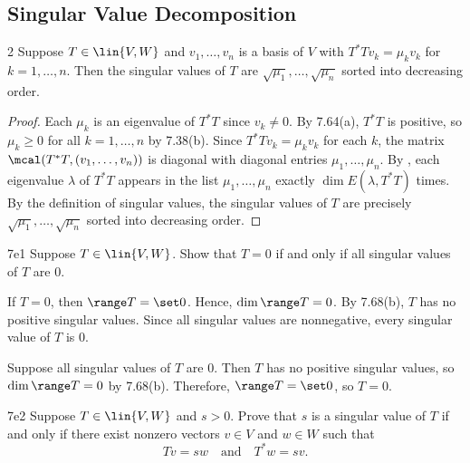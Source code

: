 \subsection{Singular Value Decomposition}

\begin{lemma}{2}
    Suppose $T \in \lin{V, W}$ and $v_1, \ldots, v_n$ is a basis of $V$ with $T^\ast T v_k = \mu_k v_k$ for $k = 1, \ldots, n$.
    Then the singular values of $T$ are $\sqrt{\mu_1}, \ldots, \sqrt{\mu_n}$ sorted into decreasing order.
    \begin{proof}
        Each $\mu_k$ is an eigenvalue of $T^\ast T$ since $v_k \neq 0$.
        By 7.64(a), $T^\ast T$ is positive, so $\mu_k \geq 0$ for all $k = 1, \ldots, n$ by 7.38(b).
        Since $T^\ast T v_k = \mu_k v_k$ for each $k$, the matrix $\mcal(T^\ast T, (v_1, \ldots, v_n))$ is diagonal with diagonal entries $\mu_1, \ldots, \mu_n$.
        By , each eigenvalue $\lambda$ of $T^\ast T$ appears in the list $\mu_1, \ldots, \mu_n$ exactly $\dim E(\lambda, T^\ast T)$ times.
        By the definition of singular values, the singular values of $T$ are precisely $\sqrt{\mu_1}, \ldots, \sqrt{\mu_n}$ sorted into decreasing order.
    \end{proof}
\end{lemma}

\begin{exercise}{7e1}
    Suppose $T \in \lin{V, W}$.
    Show that $T = 0$ if and only if all singular values of $T$ are $0$.
\end{exercise}

\begin{soliff}
    \rightimp If $T = 0$, then $\range T = \set 0$.
    Hence, $\dim \range T = 0$.
    By 7.68(b), $T$ has no positive singular values.
    Since all singular values are nonnegative, every singular value of $T$ is $0$.

    \leftimp Suppose all singular values of $T$ are $0$.
    Then $T$ has no positive singular values, so $\dim \range T = 0$ by 7.68(b).
    Therefore, $\range T = \set 0$, so $T = 0$.
\end{soliff}

\begin{exercise}{7e2}
    Suppose $T \in \lin{V, W}$ and $s > 0$.
    Prove that $s$ is a singular value of $T$ if and only if there exist nonzero vectors $v \in V$ and $w \in W$ such that
    \[
        Tv = sw \quad \text{and} \quad T^\ast w = sv.
    \]

\end{exercise}

